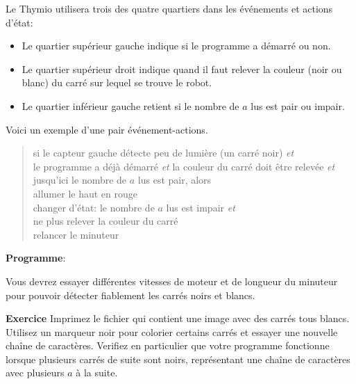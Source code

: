 Le Thymio utilisera trois des quatre quartiers dans les événements et actions d'état:

\begin{itemize}
\item Le quartier supérieur gauche indique si le programme a démarré ou non.
\item Le quartier supérieur droit indique quand il faut relever la couleur (noir ou blanc) 
du carré sur lequel se trouve le robot.
\item Le quartier inférieur gauche retient si le nombre de $a$ lus est pair ou impair.
\end{itemize}

Voici un exemple d'une pair événement-actions.


\begin{quote}
si le capteur gauche détecte peu de lumière (un carré noir) \emph{et}\\
\hspace*{1em} le programme a déjà démarré \emph{et}
la couleur du carré doit être relevée \emph{et}\\
\hspace*{1em} jusqu'ici le nombre de $a$ lus est pair, alors\\
\hspace*{2em} allumer le haut en rouge\\
\hspace*{2em} changer d'état: le nombre de $a$ lus est impair \emph{et}\\
\hspace*{4em} ne plus relever la couleur du carré\\
\hspace*{2em} relancer le minuteur
\end{quote}

{\raggedleft \hfill \textbf{Programme}: }

Vous devrez essayer différentes vitesses de moteur et de longueur du minuteur
pour pouvoir détecter fiablement les carrés noirs et blancs.

\textbf{Exercice}
Imprimez le fichier  qui contient une image avec des carrés tous blancs.
Utilisez un marqueur noir pour colorier certains carrés et essayer une nouvelle chaîne de caractères.
Verifiez en particulier que votre programme fonctionne lorsque plusieurs carrés de suite sont noirs,
représentant une chaîne de caractères avec plusieurs $a$ à la suite.

